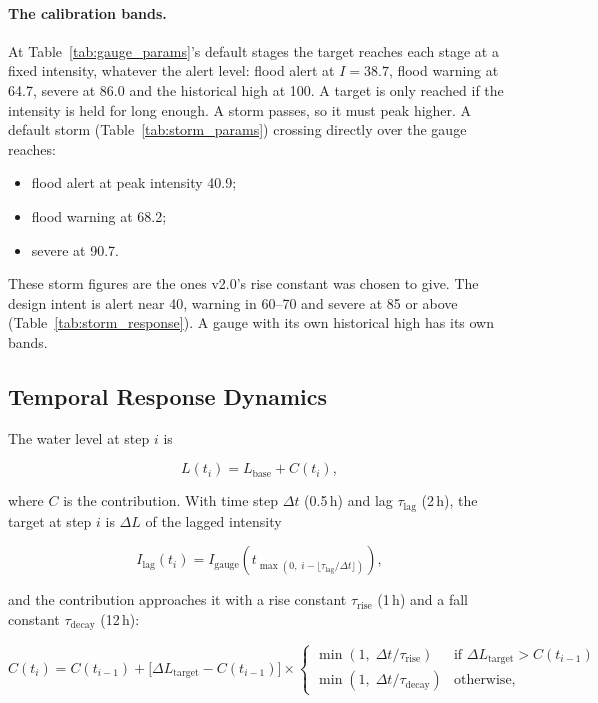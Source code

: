 \documentclass[11pt,a4paper]{article}
\newcommand{\sgSteadyAlert}{38.7}
\newcommand{\sgSteadyWarning}{64.7}
\newcommand{\sgSteadySevere}{86.0}
\newcommand{\sgStormAlert}{40.9}
\newcommand{\sgStormWarning}{68.2}
\newcommand{\sgStormSevere}{90.7}
\begin{document}
\paragraph{The calibration bands.} At Table~\ref{tab:gauge_params}'s default stages the
target reaches each stage at a fixed intensity, whatever the alert level: flood alert at
$I=\sgSteadyAlert$, flood warning at \sgSteadyWarning, severe at \sgSteadySevere{} and the
historical high at 100. A target is only reached if the intensity is held for long
enough. A storm passes, so it must peak higher. A default storm
(Table~\ref{tab:storm_params}) crossing directly over the gauge reaches:
\begin{itemize}[nosep]
    \item flood alert at peak intensity \sgStormAlert;
    \item flood warning at \sgStormWarning;
    \item severe at \sgStormSevere.
\end{itemize}
These storm figures are the ones v2.0's rise constant was chosen to give. The design
intent is alert near 40, warning in 60--70 and severe at 85 or above
(Table~\ref{tab:storm_response}). A gauge with its own historical high has its own bands.

\subsection{Temporal Response Dynamics}
\label{sec:temporal_dynamics}

The water level at step $i$ is

\begin{equation}
    L(t_i) = L_{\text{base}} + C(t_i),
    \label{eq:gauge_level}
\end{equation}

\noindent where $C$ is the contribution. With time step $\Delta t$ (0.5\,h) and lag
$\tau_{\text{lag}}$ (2\,h), the target at step $i$ is $\Delta L$ of the lagged intensity

\begin{equation}
    I_{\text{lag}}(t_i) = I_{\text{gauge}}\!\left(t_{\max(0,\; i - \lfloor \tau_{\text{lag}}/\Delta t \rfloor)}\right),
    \label{eq:lagged_intensity}
\end{equation}

\noindent and the contribution approaches it with a rise constant $\tau_{\text{rise}}$
(1\,h) and a fall constant $\tau_{\text{decay}}$ (12\,h):

\begin{equation}
    C(t_i) = C(t_{i-1}) + \bigl[\Delta L_{\text{target}} - C(t_{i-1})\bigr] \times
    \begin{cases}
        \min\!\left(1,\; \Delta t/\tau_{\text{rise}}\right) & \text{if } \Delta L_{\text{target}} > C(t_{i-1}) \\[0.5em]
        \min\!\left(1,\; \Delta t/\tau_{\text{decay}}\right) & \text{otherwise,}
    \end{cases}
    \label{eq:contribution_update}
\end{equation}
\end{document}
